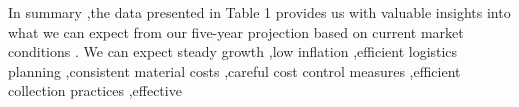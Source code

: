 In summary ,the data presented in Table 1 provides us with valuable insights into what we can expect from our five-year projection based on current market conditions . We can expect steady growth ,low inflation ,efficient logistics planning ,consistent material costs ,careful cost control measures ,efficient collection practices ,effective